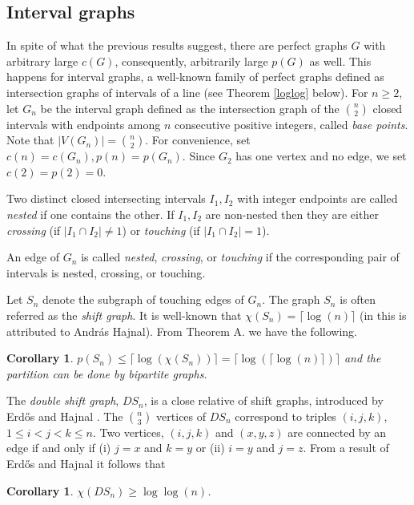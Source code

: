 \documentclass[12pt]{article}
\newtheorem{corollary}[theorem]{Corollary}
\begin{document}
\subsection{Interval graphs}

In spite of what the previous results suggest, there are perfect graphs
$G$ with arbitrary large $c(G)$, consequently, arbitrarily large $p(G)$ as well.
This happens for interval graphs, a well-known family of perfect graphs defined
as intersection graphs of intervals of a line (see Theorem \ref{loglog} below).
For $n\ge 2$, let $G_n$ be the interval graph defined as the intersection graph
of the $n\choose 2$ closed intervals with endpoints among $n$ consecutive positive integers,
called {\em base points}. Note that $|V(G_n)|={n\choose 2}$.
For convenience, set $c(n)=c(G_n),p(n)=p(G_n)$.
Since $G_2$ has one vertex and no edge, we set $c(2)=p(2)=0$.

Two distinct closed intersecting intervals $I_1,I_2$ with
integer endpoints are called {\em nested } if one contains the other.
If $I_1,I_2$ are non-nested then they are either {\em crossing}
(if  $|I_1\cap I_2|\ne 1$) or {\em touching} (if  $|I_1\cap I_2|=1$).


An edge of $G_n$ is called {\em nested}, {\em crossing}, or {\em touching}
if the corresponding
pair of
intervals is {nested},
{crossing}, or {touching}.

Let $S_n$ denote the subgraph of touching edges of $G_n$.
The graph $S_n$ is often referred as the {\em shift graph}.
It is well-known that $\chi(S_n)=\lceil\log(n)\rceil$
(in \cite{TR} this is attributed to Andr\'as Hajnal). From Theorem  A. we have the following.



\begin{corollary}\label{shift}
  $p(S_n)\le \lceil \log(\chi(S_n))\rceil = \lceil\log(\lceil\log(n)\rceil)\rceil$
  and the partition can be done by bipartite graphs.
\end{corollary}

The {\em double shift graph}, $DS_n$, is a close relative of shift graphs,
introduced by Erd\H os and Hajnal \cite{EH}.
The $n\choose 3$ vertices of $DS_n$ correspond to triples $(i, j, k)$, $1\le i<j<k\le n$.
Two vertices, $(i, j, k)$ and $(x, y, z)$ are connected by an edge if and only if
(i) $j=x$ and $k=y$ or (ii) $i=y$ and $j=z$. From a result of Erd\H os and Hajnal
\cite{EH} it follows that
\begin{corollary}\label{doblesh} $\chi(DS_n)\ge\log\log(n)$.
\end{corollary}
\end{document}
